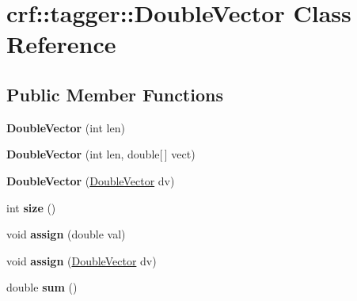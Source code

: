 \hypertarget{classcrf_1_1tagger_1_1DoubleVector}{
\section{crf::tagger::DoubleVector Class Reference}
\label{classcrf_1_1tagger_1_1DoubleVector}
}
\subsection*{Public Member Functions}
\begin{DoxyCompactItemize}
\item 
\hypertarget{classcrf_1_1tagger_1_1DoubleVector_a9025028d79315e6c92d727f33e5c0388}{
{\bfseries DoubleVector} (int len)}
\label{classcrf_1_1tagger_1_1DoubleVector_a9025028d79315e6c92d727f33e5c0388}

\item 
\hypertarget{classcrf_1_1tagger_1_1DoubleVector_a02b041b0ccfa46d6f4957461532eef2f}{
{\bfseries DoubleVector} (int len, double\mbox{[}$\,$\mbox{]} vect)}
\label{classcrf_1_1tagger_1_1DoubleVector_a02b041b0ccfa46d6f4957461532eef2f}

\item 
\hypertarget{classcrf_1_1tagger_1_1DoubleVector_a724662ed3a79faaa45f6e51926bf1f3d}{
{\bfseries DoubleVector} (\hyperlink{classcrf_1_1tagger_1_1DoubleVector}{DoubleVector} dv)}
\label{classcrf_1_1tagger_1_1DoubleVector_a724662ed3a79faaa45f6e51926bf1f3d}

\item 
\hypertarget{classcrf_1_1tagger_1_1DoubleVector_a9857b20c14dc6a4678448cfa815bcf14}{
int {\bfseries size} ()}
\label{classcrf_1_1tagger_1_1DoubleVector_a9857b20c14dc6a4678448cfa815bcf14}

\item 
\hypertarget{classcrf_1_1tagger_1_1DoubleVector_a0404b5662a7be94bc34b56d85c90e23f}{
void {\bfseries assign} (double val)}
\label{classcrf_1_1tagger_1_1DoubleVector_a0404b5662a7be94bc34b56d85c90e23f}

\item 
\hypertarget{classcrf_1_1tagger_1_1DoubleVector_a0403f4274488dabcfa4ee73399282510}{
void {\bfseries assign} (\hyperlink{classcrf_1_1tagger_1_1DoubleVector}{DoubleVector} dv)}
\label{classcrf_1_1tagger_1_1DoubleVector_a0403f4274488dabcfa4ee73399282510}

\item 
\hypertarget{classcrf_1_1tagger_1_1DoubleVector_a0ded169ea15a17048ea892ca7e1225b7}{
double {\bfseries sum} ()}
\label{classcrf_1_1tagger_1_1DoubleVector_a0ded169ea15a17048ea892ca7e1225b7}


\end{DoxyCompactItemize}
